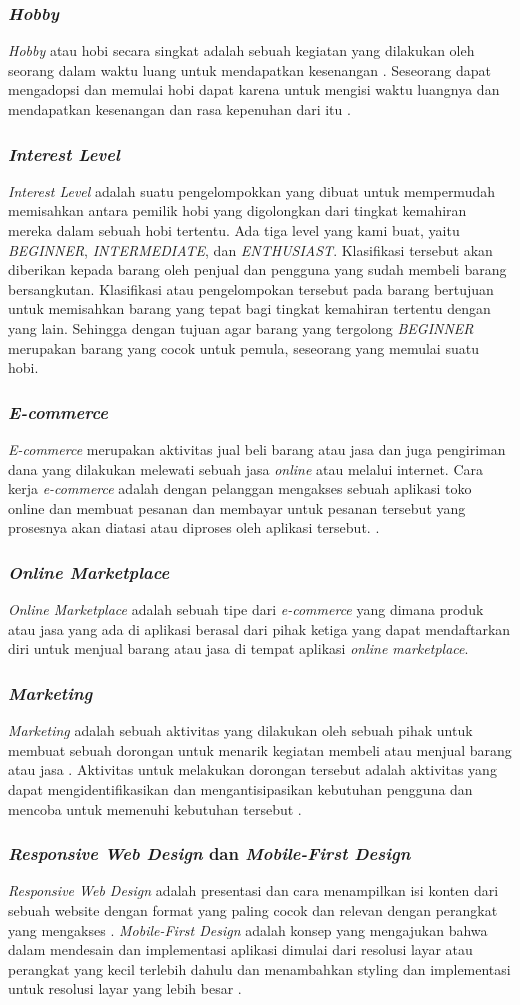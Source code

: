 \documentclass[a4paper]{article}
\newcommand{\subsubbab}[1]{%
    \subsubsection{#1}%
}
\begin{document}
\subsubbab{\textit{Hobby}}
\textit{Hobby} atau hobi secara singkat adalah sebuah kegiatan yang dilakukan oleh seorang dalam waktu luang untuk mendapatkan kesenangan \autocite{Dict_hobi}. Seseorang dapat mengadopsi dan memulai hobi dapat karena untuk mengisi waktu luangnya dan mendapatkan kesenangan dan rasa kepenuhan dari itu \autocite{linkedin_hobi}.

\subsubbab{\textit{Interest Level}}
\textit{Interest Level} adalah suatu pengelompokkan yang dibuat untuk mempermudah memisahkan antara pemilik hobi yang digolongkan dari tingkat kemahiran mereka dalam sebuah hobi tertentu. Ada tiga level yang kami buat, yaitu \textit{BEGINNER}, \textit{INTERMEDIATE}, dan \textit{ENTHUSIAST}. Klasifikasi tersebut akan diberikan kepada barang oleh penjual dan pengguna yang sudah membeli barang bersangkutan. Klasifikasi atau pengelompokan tersebut pada barang bertujuan untuk memisahkan barang yang tepat bagi tingkat kemahiran tertentu dengan yang lain. Sehingga dengan tujuan agar barang yang tergolong \textit{BEGINNER} merupakan barang yang cocok untuk pemula, seseorang yang memulai suatu hobi.

\subsubbab{\textit{E-commerce}}
\textit{E-commerce} merupakan aktivitas jual beli barang atau jasa dan juga pengiriman dana yang dilakukan melewati sebuah jasa \textit{online} atau melalui internet. Cara kerja \textit{e-commerce} adalah dengan pelanggan mengakses sebuah aplikasi toko online dan membuat pesanan dan membayar untuk pesanan tersebut yang prosesnya akan diatasi atau diproses oleh  aplikasi tersebut. \autocite{techtarget_e-commerce}.

\subsubbab{\textit{Online Marketplace}}
\textit{Online Marketplace} adalah sebuah tipe dari \textit{e-commerce} yang dimana  produk atau jasa yang ada di aplikasi berasal dari pihak ketiga yang dapat mendaftarkan diri untuk menjual barang atau jasa di tempat aplikasi \textit{online marketplace}. \autocite{pediaa_marketplace}

\subsubbab{\textit{Marketing}}
\textit{Marketing} adalah sebuah aktivitas yang dilakukan oleh sebuah pihak untuk membuat sebuah dorongan untuk menarik kegiatan membeli atau menjual barang atau jasa \autocite{Twin_2023}. Aktivitas untuk melakukan dorongan tersebut adalah aktivitas yang dapat mengidentifikasikan dan mengantisipasikan kebutuhan pengguna dan mencoba untuk memenuhi kebutuhan tersebut \autocite{openStax}.

\subsubbab{\textit{Responsive Web Design} dan \textit{Mobile-First Design}}
\textit{Responsive Web Design} adalah presentasi dan cara menampilkan isi konten dari sebuah website dengan format yang paling cocok dan relevan dengan perangkat yang mengakses \autocite{Frain_2022}. \textit{Mobile-First Design} adalah konsep yang mengajukan bahwa dalam mendesain dan implementasi aplikasi dimulai dari resolusi layar atau perangkat yang kecil terlebih dahulu dan menambahkan styling dan implementasi untuk resolusi layar yang lebih besar \autocite{Ward_2017}.
\end{document}
